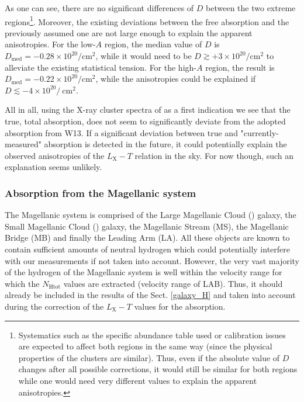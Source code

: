 \documentclass{aa}   %
\begin{document}
As one can see, there are no significant differences of $D$ between the two extreme regions\footnote{Systematics such as the specific abundance table used or calibration issues are expected to affect both regions in the same way (since the physical properties of the clusters are similar). Thus, even if the absolute value of $D$ changes after all possible corrections, it would still be similar for both regions while one would need very different values to explain the apparent anisotropies. }. Moreover, the existing deviations between the free absorption and the previously assumed one are not large enough to explain the apparent anisotropies. For the low-$A$ region, the median value of $D$ is $D_{\text{med}}=-0.28\times 10^{20}/$cm$^2$, while it would need to be $D\gtrsim +3\times 10^{20}/$cm$^2$ to alleviate the existing statistical tension. For the high-$A$ region, the result is $D_{\text{med}}=-0.22\times 10^{20}/$cm$^2$, while the anisotropies could be explained if $D\lesssim -4\times 10^{20}/\ $cm$^2$.

All in all, using the X-ray cluster spectra of \citet{lovisari19} as a first indication we see that the true, total absorption, does not seem to significantly deviate from the adopted absorption from W13. If a significant deviation between true and "currently-measured" absorption is detected in the future, it could potentially explain the observed anisotropies of the $L_{\text{X}}-T$ relation in the sky. For now though, such an explanation seems unlikely.

\subsubsection{Absorption from the Magellanic system}

The Magellanic system is comprised of the Large Magellanic Cloud () galaxy, the Small Magellanic Cloud () galaxy, the Magellanic Stream (MS), the Magellanic Bridge (MB) and finally the Leading Arm (LA). All these objects are known to contain sufficient amounts of neutral hydrogen which could potentially interfere with our measurements if not taken into account. However, the very vast majority of the hydrogen of the Magellanic system is well within the velocity range for which the $N_{\text{Htot}}$ values are extracted (velocity range of LAB). Thus, it should already be included in the results of the Sect. \ref{galaxy_H} and taken into account during the correction of the $L_{\text{X}}-T$ values for the absorption. 
\end{document}
